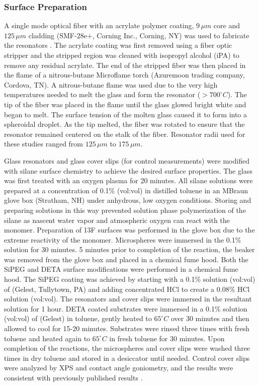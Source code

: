 \subsubsection{Surface Preparation}

A single mode optical fiber with an acrylate polymer coating, $9\,\mu m$
core and $125\,\mu m$ cladding (SMF-28e+, Corning Inc., Corning,
NY) was used to fabricate the resonators \cite{Vollmer2002}. The
acrylate coating was first removed using a fiber optic stripper and
the stripped region was cleaned with isopropyl alcohol (iPA) to remove
any residual acrylate. The end of the stripped fiber was then placed
in the flame of a nitrous-butane Microflame torch (Azuremoon trading
company, Cordova, TN). A nitrous-butane flame was used due to the
very high temperatures needed to melt the glass and form the resonator
($>700^{\circ}C$). The tip of the fiber was placed in the flame until
the glass glowed bright white and began to melt. The surface tension
of the molten glass caused it to form into a spheroidal droplet. As
the tip melted, the fiber was rotated to ensure that the resonator
remained centered on the stalk of the fiber. Resonator radii used
for these studies ranged from $125\,\mu m$ to $175\,\mu m$.

Glass resonators and glass cover slips (for control measurements)
were modified with silane surface chemistry to achieve the desired
surface properties. The glass was first treated with an oxygen plasma
for 20 minutes. All silane solutions were prepared at a concentration
of 0.1\% (vol:vol) in distilled toluene in an MBraun glove box (Stratham,
NH) under anhydrous, low oxygen conditions. Storing and preparing
solutions in this way prevented solution phase polymerization of the
silane as nascent water vapor and atmospheric oxygen can react with
the monomer. Preparation of 13F surfaces was performed in the glove
box due to the extreme reactivity of the monomer. Microspheres were
immersed in the 0.1\% 
solution for 30 minutes. 5 minutes prior to completion of the reaction,
the beaker was removed from the glove box and placed in a chemical
fume hood. Both the SiPEG and DETA surface modifications were performed
in a chemical fume hood. The SiPEG coating was achieved by starting
with a 0.1\% solution (vol:vol) of 
(Gelest, Tullytown, PA) and adding concentrated HCl to create a 0.08\%
HCl solution (vol:vol). The resonators and cover slips were immersed
in the resultant solution for 1 hour. DETA coated substrates were
immersed in a 0.1\% solution (vol:vol) of 
(Gelest) in toluene, gently heated to $65^{\circ}C$ over 30 minutes
and then allowed to cool for 15-20 minutes. Substrates were rinsed
three times with fresh toluene and heated again to $65^{\circ}C$
in fresh toluene for 30 minutes. Upon completion of the reactions,
the microspheres and cover slips were washed three times in dry toluene
and stored in a desiccator until needed. Control cover slips were
analyzed by XPS and contact angle goniometry, and the results were
consistent with previously published results \cite{Wilson2011a}.


